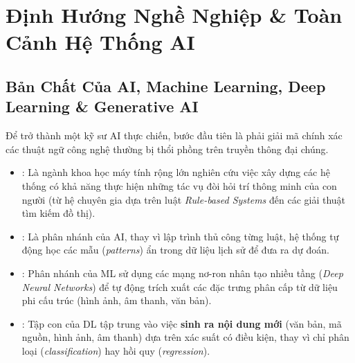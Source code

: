 
\chapter{Định Hướng Nghề Nghiệp \& Toàn Cảnh Hệ Thống AI}
\label{ch:phase0-orientation}

\section{Bản Chất Của AI, Machine Learning, Deep Learning \& Generative AI}
\label{sec:p0-fundamentals}

Để trở thành một kỹ sư AI thực chiến, bước đầu tiên là phải giải mã chính xác các thuật ngữ công nghệ thường bị thổi phồng trên truyền thông đại chúng.

\begin{definitionbox}
\begin{itemize}
  \item {}: Là ngành khoa học máy tính rộng lớn nghiên cứu việc xây dựng các hệ thống có khả năng thực hiện những tác vụ đòi hỏi trí thông minh của con người (từ hệ chuyên gia dựa trên luật \textit{Rule-based Systems} đến các giải thuật tìm kiếm đồ thị).
  \item {}: Là phân nhánh của AI, thay vì lập trình thủ công từng luật, hệ thống tự động học các mẫu (\textit{patterns}) ẩn trong dữ liệu lịch sử để đưa ra dự đoán.
  \item {}: Phân nhánh của ML sử dụng các mạng nơ-ron nhân tạo nhiều tầng (\textit{Deep Neural Networks}) để tự động trích xuất các đặc trưng phân cấp từ dữ liệu phi cấu trúc (hình ảnh, âm thanh, văn bản).
  \item {}: Tập con của DL tập trung vào việc \textbf{sinh ra nội dung mới} (văn bản, mã nguồn, hình ảnh, âm thanh) dựa trên xác suất có điều kiện, thay vì chỉ phân loại (\textit{classification}) hay hồi quy (\textit{regression}).
\end{itemize}
\end{definitionbox}

